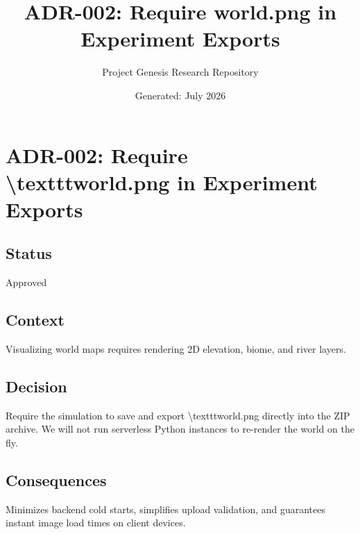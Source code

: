 \documentclass[11pt,a4paper]{article}
\title{\textbf{ADR-002: Require world.png in Experiment Exports}}
\author{Project Genesis Research Repository}
\date{\small Generated: July 2026}
\begin{document}
\maketitle
\thispagestyle{empty}

\newpage
\section*{ADR-002: Require \textbackslash{}texttt{world.png} in Experiment Exports}

\subsection*{Status}
Approved

\subsection*{Context}
Visualizing world maps requires rendering 2D elevation, biome, and river layers.

\subsection*{Decision}
Require the simulation to save and export \textbackslash{}texttt{world.png} directly into the ZIP archive. We will not run serverless Python instances to re-render the world on the fly.

\subsection*{Consequences}
Minimizes backend cold starts, simplifies upload validation, and guarantees instant image load times on client devices.
\end{document}
